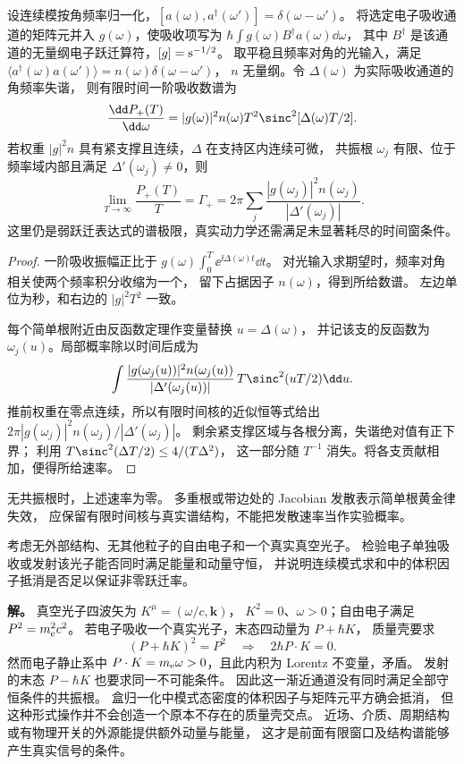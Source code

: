 \begin{proposition}
设连续模按角频率归一化，$[a(\omega),a^\dagger(\omega')]=\delta(\omega-\omega')$。
将选定电子吸收通道的矩阵元并入 $g(\omega)$，使吸收项写为
$\hbar\int g(\omega)B^\dagger a(\omega)\dd\omega$，
其中 $B^\dagger$ 是该通道的无量纲电子跃迁算符，$[g]={\rm s^{-1/2}}$。
取平稳且频率对角的光输入，满足
$\langle a^\dagger(\omega)a(\omega')\rangle=n(\omega)\delta(\omega-\omega')$，
$n$ 无量纲。令 $\Delta(\omega)$ 为实际吸收通道的角频率失谐，
则有限时间一阶吸收数谱为
\begin{equation}
 \frac{\dd P_+(T)}{\dd\omega}=|g(\omega)|^2 n(\omega)
 T^2\sinc^2[\Delta(\omega)T/2].
 \label{eq:feqo-continuum-mode-amplitude}
\end{equation}
若权重 $|g|^2n$ 具有紧支撑且连续，$\Delta$ 在支持区内连续可微，
共振根 $\omega_j$ 有限、位于频率域内部且满足 $\Delta'(\omega_j)\ne0$，则
\begin{equation}
 \lim_{T\to\infty}\frac{P_+(T)}T=
 \Gamma_+=2\pi\sum_j\frac{|g(\omega_j)|^2n(\omega_j)}{|\Delta'(\omega_j)|}.
 \label{eq:feqo-continuum-absorption}
\end{equation}
这里仍是弱跃迁表达式的谱极限，真实动力学还需满足未显著耗尽的时间窗条件。
\end{proposition}
\begin{proof}
一阶吸收振幅正比于 $g(\omega)\int_0^T\ee^{\ii\Delta(\omega)t}\dd t$。
对光输入求期望时，频率对角相关使两个频率积分收缩为一个，
留下占据因子 $n(\omega)$，得到所给数谱。
左边单位为秒，和右边的 $|g|^2T^2$ 一致。

每个简单根附近由反函数定理作变量替换 $u=\Delta(\omega)$，
并记该支的反函数为 $\omega_j(u)$。局部概率除以时间后成为
\[
\int\frac{|g(\omega_j(u))|^2n(\omega_j(u))}
{|\Delta'(\omega_j(u))|}\,
T\sinc^2(uT/2)\dd u.
\]
推前权重在零点连续，所以有限时间核的近似恒等式给出
$2\pi|g(\omega_j)|^2n(\omega_j)/|\Delta'(\omega_j)|$。
剩余紧支撑区域与各根分离，失谐绝对值有正下界；
利用 $T\sinc^2(\Delta T/2)\le4/(T\Delta^2)$，
这一部分随 $T^{-1}$ 消失。将各支贡献相加，便得所给速率。
\end{proof}

无共振根时，上述速率为零。
多重根或带边处的 Jacobian 发散表示简单根黄金律失效，
应保留有限时间核与真实谱结构，不能把发散速率当作实验概率。

\begin{exbox}[真空单光子通道是否存在]
考虑无外部结构、无其他粒子的自由电子和一个真实真空光子。
检验电子单独吸收或发射该光子能否同时满足能量和动量守恒，
并说明连续模式求和中的体积因子抵消是否足以保证非零跃迁率。

\textbf{解。} 真空光子四波矢为 $K^\mu=(\omega/c,\mathbf k)$，
$K^2=0$、$\omega>0$；自由电子满足 $P^2=m_{\rm e}^2c^2$。
若电子吸收一个真实光子，末态四动量为 $P+\hbar K$，
质量壳要求
\[
(P+\hbar K)^2=P^2\quad\Longrightarrow\quad 2\hbar P\cdot K=0.
\]
然而电子静止系中 $P\cdot K=m_{\rm e}\omega>0$，且此内积为 Lorentz 不变量，矛盾。
发射的末态 $P-\hbar K$ 也要求同一不可能条件。
因此这一渐近通道没有同时满足全部守恒条件的共振根。
盒归一化中模式态密度的体积因子与矩阵元平方确会抵消，
但这种形式操作并不会创造一个原本不存在的质量壳交点。
近场、介质、周期结构或有物理开关的外源能提供额外动量与能量，
这才是前面有限窗口及结构谱能够产生真实信号的条件。
\end{exbox}
